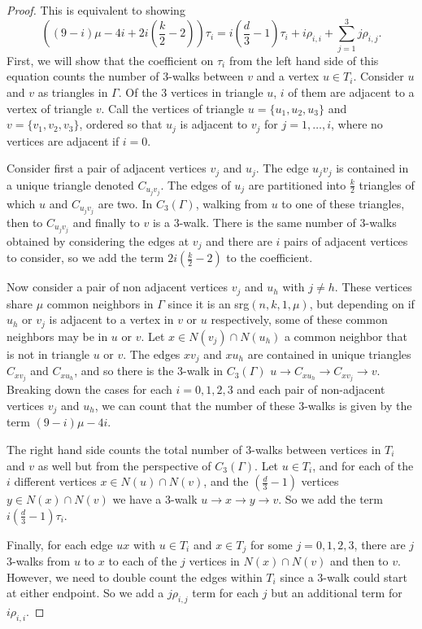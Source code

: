 \documentclass[12pt]{report}
\theoremstyle{definition}
\begin{document}
\begin{proof}
    This is equivalent to showing
    \[\left((9-i)\mu -4i +2i\left(\frac{k}{2}-2 \right) \right)\tau_i=i\left(\frac{d}{3}-1\right)\tau_i+i\rho_{i,i}+\sum_{j=1}^3j\rho_{i,j}.\]
    First, we will show that the coefficient on $\tau_i$ from the left hand side of this equation counts the number of 3-walks between $v$ and a vertex $u\in T_i$. Consider $u$ and $v$ as triangles in $\Gamma$. Of the 3 vertices in triangle $u$, $i$ of them are adjacent to a vertex of triangle $v$. Call the vertices of triangle $u=\{u_1,u_2,u_3\}$ and $v=\{v_1,v_2,v_3\}$, ordered so that $u_j$ is adjacent to $v_j$ for $j=1,\ldots, i$, where no vertices are adjacent if $i=0$.\par 
    Consider first a pair of adjacent vertices $v_j$ and $u_j$. The edge $u_jv_j$ is contained in a unique triangle denoted $C_{u_jv_j}$. The edges of $u_j$ are partitioned into $\frac{k}{2}$ triangles of which $u$ and $C_{u_jv_j}$ are two. In $C_3(\Gamma)$, walking from $u$ to one of these triangles, then to $C_{u_jv_j}$ and finally to $v$ is a 3-walk. There is the same number of 3-walks obtained by considering the edges at $v_j$ and there are $i$ pairs of adjacent vertices to consider, so we add the term $2i\left(\frac{k}{2}-2 \right)$ to the coefficient. \par
    Now consider a pair of non adjacent vertices $v_j$ and $u_h$ with $j\neq h$. These vertices share $\mu$ common neighbors in $\Gamma$ since it is an srg$(n,k,1,\mu)$, but depending on if $u_h$ or $v_j$ is adjacent to a vertex in $v$ or $u$ respectively, some of these common neighbors may be in $u$ or $v$. Let $x\in N(v_j)\cap N(u_h)$ a common neighbor that is not in triangle $u$ or $v$. The edges $xv_j$ and $xu_h$ are contained in unique triangles $C_{xv_j}$ and $C_{xu_h}$, and so there is the 3-walk in $C_3(\Gamma)$ $u\to C_{xu_h}\to C_{xv_j}\to v$. Breaking down the cases for each $i=0,1,2,3$ and each pair of non-adjacent vertices $v_j$ and $u_h$, we can count that the number of these 3-walks is given by the term $(9-i)\mu -4i$.\par
    The right hand side counts the total number of 3-walks between vertices in $T_i$ and $v$ as well but from the perspective of $C_3(\Gamma)$. Let $u\in T_i$, and for each of the $i$ different vertices $x\in N(u)\cap N(v)$, and the $\left( \frac{d}{3} -1\right)$ vertices $y \in N(x)\cap N(v)$ we have a 3-walk $u\to x\to y \to v$. So we add the term $i\left(\frac{d}{3}-1\right)\tau_i$.\par
    Finally, for each edge $ux$ with $u\in T_i$ and $x\in T_j$ for some $j=0,1,2,3$, there are $j$ 3-walks from $u$ to $x$ to each of the $j$ vertices in $N(x)\cap N(v)$ and then to $v$. However, we need to double count the edges within $T_i$ since a 3-walk could start at either endpoint. So we add a $j\rho_{i,j}$ term for each $j$ but an additional term for $i\rho_{i,i}$.
\end{proof}
\end{document}
